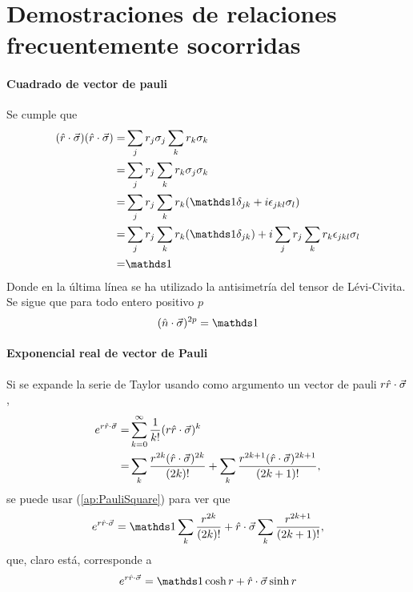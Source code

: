 \chapter{Demostraciones de relaciones frecuentemente socorridas}

\subsubsection{Cuadrado de vector de pauli}
Se cumple que
\begin{align}
    (\paulivec{r})(\paulivec{r})=&\sum_{j}r_{j}\pauli{j}\sum_{k}r_{k}\pauli{k}\nonumber\\
    =&\sum_{j}r_{j}\sum_{k}r_{k}\pauli{j}\pauli{k}\nonumber\\
    =&\sum_{j}r_{j}\sum_{k}r_{k}(\Id\delta_{jk}+i\epsilon_{jkl}\pauli{l})\nonumber\\
    =&\sum_{j}r_{j}\sum_{k}r_{k}(\Id\delta_{jk})+i\sum_{j}r_{j}\sum_{k}r_{k}\epsilon_{jkl}\pauli{l}\nonumber\\
    =&\Id\nonumber
\end{align}
Donde en la última línea se ha utilizado la antisimetría del tensor de Lévi-Civita. Se sigue que para todo entero positivo $p$
\begin{equation}\label{ap:PauliSquare}
    (\paulivec{n})^{2p}=\Id
\end{equation}

\subsubsection{Exponencial real de vector de Pauli}
Si se expande la serie de Taylor usando como argumento un vector de pauli $r\hat{r}\cdot\vec{\sigma}$,
\begin{align}
    e^{r\hat{r}\cdot\vec{\sigma}}=&\sum_{k=0}^{\infty}\frac{1}{k!}(r\hat{r}\cdot\vec{\sigma})^k\nonumber\\
    =&\sum_{k}\frac{r^{2k}(\hat{r}\cdot\vec{\sigma})^{2k}}{(2k)!}+\sum_{k}\frac{r^{2k+1}(\hat{r}\cdot\vec{\sigma})^{2k+1}}{(2k+1)!},\nonumber
\end{align}
se puede usar (\ref{ap:PauliSquare}) para ver que
\begin{equation}
    e^{r\paulivec{r}}=\Id\sum_{k}\frac{r^{2k}}{(2k)!}+\paulivec{r}\sum_{k}\frac{r^{2k+1}}{(2k+1)!},\nonumber
\end{equation}
que, claro está, corresponde a
\begin{equation}\label{ap:PauliRealExp}
    e^{r\paulivec{r}}=\Id\cosh{r}+\paulivec{r}\sinh{r}
\end{equation}



